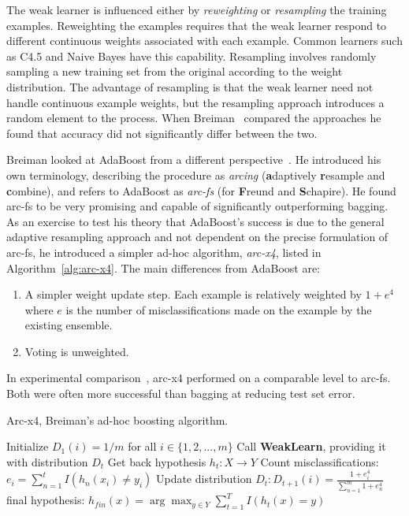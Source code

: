 The weak learner is influenced either by {\em reweighting} or {\em resampling} the training examples. Reweighting the examples requires that the weak learner respond to different continuous weights associated with each example. Common learners such as C4.5 and Naive Bayes have this capability. Resampling involves randomly sampling a new training set from the original according to the weight distribution. The advantage of resampling is that the weak learner need not handle continuous example weights, but the resampling approach introduces a random element to the process. When Breiman~\cite{arcing} compared the approaches he found that accuracy did not significantly differ between the two. 

Breiman looked at AdaBoost from a different perspective~\cite{arcing}. He introduced his own terminology, describing the procedure as {\em arcing} ({\bf a}daptively {\bf r}esample and {\bf c}ombine), and refers to AdaBoost as {\em arc-fs} (for {\bf F}reund and {\bf S}chapire). He found arc-fs to be very promising and capable of significantly outperforming bagging. As an exercise to test his theory that AdaBoost's success is due to the general adaptive resampling approach and not dependent on the precise formulation of arc-fs, he introduced a simpler ad-hoc algorithm, {\em arc-x4}, listed in Algorithm~\ref{alg:arc-x4}. The main differences from AdaBoost are:
\begin{enumerate}
\item A simpler weight update step. Each example is relatively weighted by $1+e^{4}$ where $e$ is the number of misclassifications made on the example by the existing ensemble.
\item Voting is unweighted.
\end{enumerate}
In experimental comparison~\cite{arcing}, arc-x4 performed on a comparable level to arc-fs. Both were often more successful than bagging at reducing test set error.

\begin{algorithm}
\caption{Arc-x4, Breiman's ad-hoc boosting algorithm.}
\begin{algorithmic}[1]
\STATE Initialize $D_{1}(i) = 1/m$ for all $i \in \{1,2,...,m\}$
\STATE Call {\bf WeakLearn}, providing it with distribution $D_{t}$
\STATE Get back hypothesis $h_{t} : X \to Y$
\STATE Count misclassifications: $e_{i} = \sum_{n=1}^{t} I(h_{n}(x_{i}) \ne y_{i})$
\STATE Update distribution $D_{t}: D_{t+1}(i) = \frac{1+e_{i}^{4}}{\sum_{n=1}^{m} 1+e_{n}^4}$
\ENDFOR
\RETURN final hypothesis: $h_{fin}(x) = \arg \max_{y \in Y} \sum_{t=1}^{T} I(h_{t}(x) = y)$
\end{algorithmic}
\label{alg:arc-x4}
\end{algorithm}

